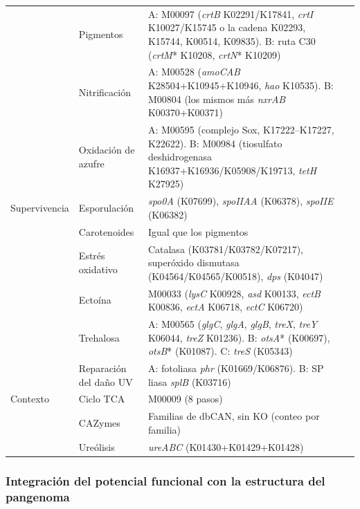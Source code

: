 \begin{nuevo}
{\begin{xltabular}{\textwidth}{>{\raggedright\arraybackslash}p{2.3cm}>{\raggedright\arraybackslash}p{2.4cm}>{\raggedright\arraybackslash}X>{\raggedright\arraybackslash}p{2.6cm}}
 & Pigmentos & A: M00097 (\textit{crtB} K02291/K17841, \textit{crtI} K10027/K15745 o la cadena K02293, K15744, K00514, K09835). B: ruta C30 (\textit{crtM}* K10208, \textit{crtN}* K10209) & \cite{basile2025, santanamolina2022, gaylarde2021} \\
 & Nitrificación & A: M00528 (\textit{amoCAB} K28504+K10945+K10946, \textit{hao} K10535). B: M00804 (los mismos más \textit{nxrAB} K00370+K00371) & \cite{dakal2012, zanardini2019} \\
 & Oxidación de azufre & A: M00595 (complejo Sox, K17222--K17227, K22622). B: M00984 (tiosulfato deshidrogenasa K16937+K16936/K05908/K19713, \textit{tetH} K27925) & \cite{dakal2012, zanardini2019} \\
\midrule
Supervivencia & Esporulación & \textit{spo0A} (K07699), \textit{spoIIAA} (K06378), \textit{spoIIE} (K06382) & \cite{Galperin2022} \\
 & Carotenoides & Igual que los pigmentos & \cite{basile2025, santanamolina2022} \\
 & Estrés oxidativo & Catalasa (K03781/K03782/K07217), superóxido dismutasa (K04564/K04565/K00518), \textit{dps} (K04047) & \cite{imlay2013} \\
 & Ectoína & M00033 (\textit{lysC} K00928, \textit{asd} K00133, \textit{ectB} K00836, \textit{ectA} K06718, \textit{ectC} K06720) & \cite{alonsoreyes2021, elistratova2026} \\
 & Trehalosa & A: M00565 (\textit{glgC}, \textit{glgA}, \textit{glgB}, \textit{treX}, \textit{treY} K06044, \textit{treZ} K01236). B: \textit{otsA}* (K00697), \textit{otsB}* (K01087). C: \textit{treS} (K05343) & \cite{elistratova2026, laskowska2020} \\
 & Reparación del daño UV & A: fotoliasa \textit{phr} (K01669/K06876). B: SP liasa \textit{splB} (K03716) & \cite{goosen2008} \\
\midrule
Contexto & Ciclo TCA & M00009 (8 pasos) & \cite{kegg2023} \\
 & CAZymes & Familias de dbCAN, sin KO (conteo por familia) & \cite{cantarel2009, zhang2018} \\
 & Ureólisis & \textit{ureABC} (K01430+K01429+K01428) & \cite{dhami2013, li2018} \\
\end{xltabular}
}
\end{nuevo}

\subsubsection{Integración del potencial funcional con la estructura del pangenoma}

